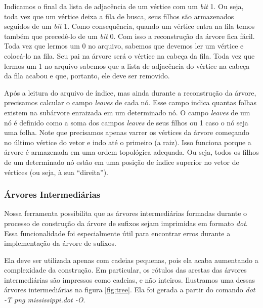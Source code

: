 \documentclass[]{article}
\newcommand{\figref}[1]{figura \ref{#1}}
\begin{document}
Indicamos o final da lista de adjacência de um vértice com um \textit{bit} 1. Ou seja, toda vez que um vértice deixa a fila de busca, seus filhos são armazenados seguidos de um \textit{bit} 1. Como consequência, quando um vértice entra na fila temos também que precedê-lo de um \textit{bit} 0. Com isso a reconstrução da árvore fica fácil. Toda vez que lermos um 0 no arquivo, sabemos que devemos ler um vértice e colocá-lo na fila. Seu pai na árvore será o vértice na cabeça da fila. Toda vez que lermos um 1 no arquivo sabemos que a lista de adjacência do vértice na cabeça da fila acabou e que, portanto, ele deve ser removido. 

Após a leitura do arquivo de índice, mas ainda durante a reconstrução da árvore, precisamos calcular o campo \textit{leaves} de cada nó. Esse campo indica quantas folhas existem na subárvore enraizada em um determinado nó. O campo \textit{leaves} de um nó é definido como a soma dos campos \textit{leaves} de seus filhos ou 1 caso o nó seja uma folha. Note que precisamos apenas varrer os vértices da árvore começando no último vértice do vetor e indo até o primeiro (a raiz). Isso funciona porque a árvore é armazenada em uma ordem topológica adequada. Ou seja, todos os filhos de um determinado nó estão em uma posição de índice superior no vetor de vértices (ou seja, à sua ``direita'').

\subsubsection{Árvores Intermediárias}

Nossa ferramenta possibilita que as árvores intermediárias formadas durante o processo de construção da árvore de sufixos sejam imprimidas em formato \textit{dot}. Essa funcionalidade foi especialmente útil para encontrar erros durante a implementação da árvore de sufixos.

Ela deve ser utilizada apenas com cadeias pequenas, pois ela acaba aumentando a complexidade da construção. Em particular, os rótulos das arestas das árvores intermediárias são impressos como cadeias, e não inteiros. Ilustramos uma dessas árvores intermediárias na \figref{fig:tree}. Ela foi gerada a partir do comando \textit{dot -T png mississippi.dot -O}.
\end{document}
